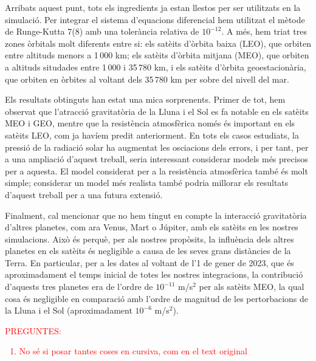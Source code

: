 \documentclass{article}
\begin{document}
Arribats aquest punt, tots els ingredients ja estan llestos per ser utilitzats en la simulació. Per integrar el sistema d'equacions diferencial hem utilitzat el mètode de Runge-Kutta 7(8) amb una tolerància relativa de $10^{-12}$. A més, hem triat tres zones òrbitals molt diferents entre si: els satè\lgem its d'òrbita baixa (LEO), que orbiten entre altituds menors a 1\,000 km; els satè\lgem its d'òrbita mitjana (MEO), que orbiten a altituds situdades entre 1\,000 i 35\,780 km, i els satè\lgem its d'òrbita geoestacionària, que orbiten en òrbites al voltant dels 35\,780 km per sobre del nivell del mar.

Els resultats obtinguts han estat una mica sorprenents. Primer de tot, hem observat que l'atracció gravitatòria de la Lluna i el Sol es fa notable en els satè\lgem its MEO i GEO, mentre que la resistència atmosfèrica només és important en els satè\lgem its LEO, com ja havíem predit anteriorment. En tots els casos estudiats, la pressió de la radiació solar ha augmentat les osci\lgem acions dels errors, i per tant, per a una ampliació d'aquest treball, seria interessant considerar models més precisos per a aquesta. El model considerat per a la resistència atmosfèrica també és molt simple; considerar un model més realista també podria millorar els resultats d'aquest treball per a una futura extensió.

Finalment, cal mencionar que no hem tingut en compte la interacció gravitatòria d'altres planetes, com ara Venus, Mart o Júpiter, amb els satè\lgem its en les nostres simulacions. Això és perquè, per als nostres propòsits, la influència dels altres planetes en els satè\lgem its és negligible a causa de les seves grans distàncies de la Terra. En particular, per a les dates al voltant de l'1 de gener de 2023, que és aproximadament el temps inicial de totes les nostres integracions, la contribució d'aquests tres planetes era de l'ordre de $10^{-11}$ m/s$^2$ per als satè\lgem its MEO, la qual cosa és negligible en comparació amb l'ordre de magnitud de les pertorbacions de la Lluna i el Sol (aproximadament $10^{-6}$ m/s$^2$).

\textcolor{red}{
  PREGUNTES:
  \begin{enumerate}
    \item No sé si posar tantes coses en cursiva, com en el text original
  \end{enumerate}}
\end{document}

